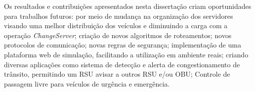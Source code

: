 \documentclass[
	12pt,				%
	oneside,			%
	a4paper,			%
	english,			%
	brazil				%
	]{abntex2ppgsi}
\begin{document}
Os resultados e contribuições apresentados nesta dissertação criam oportunidades para trabalhos futuros: por meio de mudança na organização dos servidores visando uma melhor distribuição dos veículos e diminuindo a carga com a operação \textit{ChangeServer}; criação de novos algoritmos de roteamentos; novos protocolos de comunicação; novas regras de segurança; implementação de uma plataforma web de simulação, facilitando a utilização em ambiente reais;  criando diversas aplicações como sistema de detecção e alerta de congestionamento de trânsito, permitindo um RSU avisar a outros RSU e/ou OBU; Controle de passagem livre para veículos de urgência e emergência.


\postextual



%
%






\end{document}
